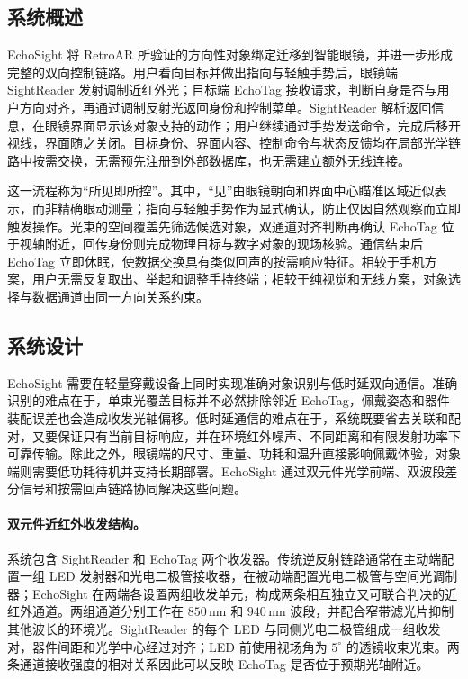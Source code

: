 \subsection{系统概述}
EchoSight 将 RetroAR 所验证的方向性对象绑定迁移到智能眼镜，并进一步形成完整的双向控制链路。用户看向目标并做出指向与轻触手势后，眼镜端 SightReader 发射调制近红外光；目标端 EchoTag 接收请求，判断自身是否与用户方向对齐，再通过调制反射光返回身份和控制菜单。SightReader 解析返回信息，在眼镜界面显示该对象支持的动作；用户继续通过手势发送命令，完成后移开视线，界面随之关闭。目标身份、界面内容、控制命令与状态反馈均在局部光学链路中按需交换，无需预先注册到外部数据库，也无需建立额外无线连接。

这一流程称为“所见即所控”。其中，“见”由眼镜朝向和界面中心瞄准区域近似表示，而非精确眼动测量；指向与轻触手势作为显式确认，防止仅因自然观察而立即触发操作。光束的空间覆盖先筛选候选对象，双通道对齐判断再确认 EchoTag 位于视轴附近，回传身份则完成物理目标与数字对象的现场核验。通信结束后 EchoTag 立即休眠，使数据交换具有类似回声的按需响应特征。相较于手机方案，用户无需反复取出、举起和调整手持终端；相较于纯视觉和无线方案，对象选择与数据通道由同一方向关系约束。

\subsection{系统设计}
EchoSight 需要在轻量穿戴设备上同时实现准确对象识别与低时延双向通信。准确识别的难点在于，单束光覆盖目标并不必然排除邻近 EchoTag，佩戴姿态和器件装配误差也会造成收发光轴偏移。低时延通信的难点在于，系统既要省去关联和配对，又要保证只有当前目标响应，并在环境红外噪声、不同距离和有限发射功率下可靠传输。除此之外，眼镜端的尺寸、重量、功耗和温升直接影响佩戴体验，对象端则需要低功耗待机并支持长期部署。EchoSight 通过双元件光学前端、双波段差分信号和按需回声链路协同解决这些问题。

\paragraph{双元件近红外收发结构。}
系统包含 SightReader 和 EchoTag 两个收发器。传统逆反射链路通常在主动端配置一组 LED 发射器和光电二极管接收器，在被动端配置光电二极管与空间光调制器；EchoSight 在两端各设置两组收发单元，构成两条相互独立又可联合判决的近红外通道。两组通道分别工作在 $850\,\mathrm{nm}$ 和 $940\,\mathrm{nm}$ 波段，并配合窄带滤光片抑制其他波长的环境光。SightReader 的每个 LED 与同侧光电二极管组成一组收发对，器件间距和光学中心经过对齐；LED 前使用视场角为 $5^\circ$ 的透镜收束光束。两条通道接收强度的相对关系因此可以反映 EchoTag 是否位于预期光轴附近。

